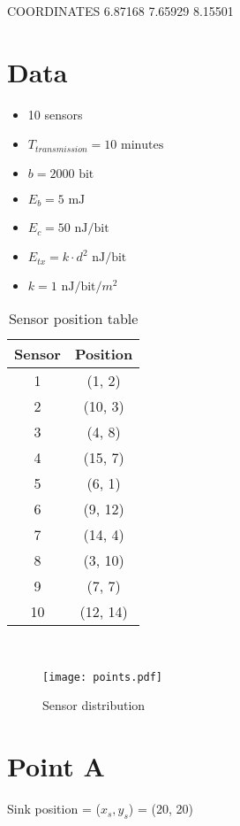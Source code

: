 COORDINATES
6.87168 7.65929 8.15501

\section{Data}
\begin{itemize}
	\item 10 sensors
	\item $T_{transmission} = 10 \text{ minutes}$
	\item $b = 2000 \text{ bit}$
	\item $E_b = 5 \text{ mJ}$
	\item $E_c = 50 \text{ nJ/bit}$
	\item $E_{tx} = k \cdot d^2 \text{ nJ/bit}$
	\item $k = 1 \text{ nJ/bit/$m^2$}$
\end{itemize}
\begin{table}[H]
\centering 
\begin{tabular}{| c | c |}
	\hline 
	\rowcolor{bluepoli!40}
	\textbf{Sensor} & \textbf{Position}\T\B \\
	\hline 
	1 & (1, 2) \T\B\\
	2 &(10, 3) \T\B\\
	3 & (4, 8) \T\B\\
	4 & (15, 7) \T\B\\
	5  & (6, 1) \T\B\\
	6  & (9, 12) \T\B\\
	7  & (14, 4) \T\B\\
	8  & (3, 10) \T\B\\
	9  & (7, 7) \T\B\\
	10  & (12, 14) \T\B\\
	\hline
\end{tabular}
\\[10pt]
\caption{Sensor position table}
\label{table:sensor_position_table}
\end{table}

\begin{figure}[H]
    \centering
    \texttt{[image: points.pdf]}
    \caption{Sensor distribution}
    \label{fig:Sensor_distribution}
\end{figure}

\section{Point A}
Sink position = ($x_s, y_s$) = (20, 20)\\


